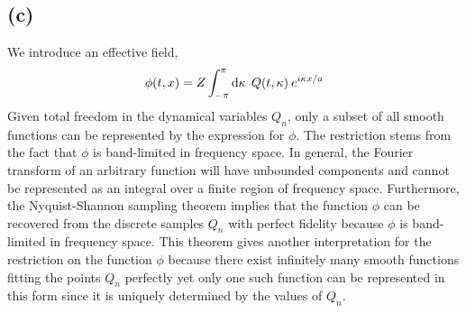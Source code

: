 \documentclass[12pt]{extarticle}
\begin{document}
\subsection*{(c)}
We introduce an effective field,
\[ \phi(t, x) = Z \int_{-\pi}^{\pi} \mathrm{d}\kappa \: \: Q(t, \kappa) \: e^{i \kappa x / a} \]
Given total freedom in the dynamical variables $Q_n$, only a subset of all smooth functions can be represented by the expression for $\phi$. The restriction stems from the fact that $\phi$ is band-limited in frequency space. In general, the Fourier transform of an arbitrary function will have unbounded components and cannot be represented as an integral over a finite region of frequency space. Furthermore, the Nyquist-Shannon sampling theorem implies that the function $\phi$ can be recovered from the discrete samples $Q_n$ with perfect fidelity because $\phi$ is band-limited in frequency space. This theorem gives another interpretation for the restriction on the function $\phi$ because there exist infinitely many smooth functions fitting the points $Q_n$ perfectly yet only one such function can be represented in this form since it is uniquely determined by the values of $Q_n$.     
\end{document}

